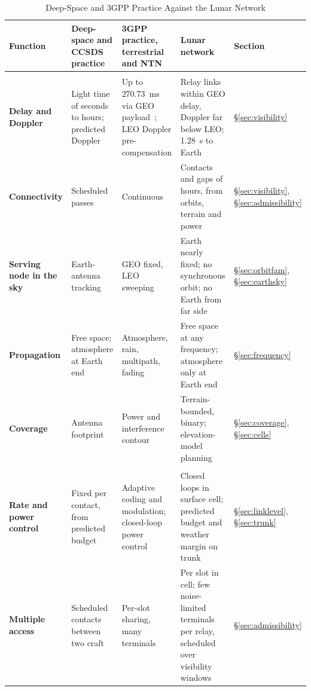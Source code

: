 \documentclass{IEEEoj}
\renewcommand{\arraystretch}{1.25}
\begin{document}
\begin{table}[!t]
\caption{Deep-Space and 3GPP Practice Against the Lunar Network}
\label{tab:rosetta_radio}
\centering
\footnotesize
\renewcommand{\arraystretch}{1.1}
\setlength{\tabcolsep}{4pt}
\begin{tabularx}{\textwidth}{@{}>{\raggedright\arraybackslash\bfseries}p{1.9cm}>{\raggedright\arraybackslash}p{2.9cm}>{\raggedright\arraybackslash}p{3.2cm}>{\raggedright\arraybackslash}X>{\raggedright\arraybackslash}p{1.15cm}@{}}
\toprule
\rowcolor{tabhead}\textbf{Function} & \textbf{Deep-space and CCSDS practice} & \textbf{3GPP practice, terrestrial and NTN} & \textbf{Lunar network} & \textbf{Section} \\
\midrule
\rowcolor{tabgroup}\multicolumn{5}{@{}l}{\emph{Geometry and propagation}}\\
Delay and Doppler & Light time of seconds to hours; predicted Doppler & Up to \SI{270.73}{ms} via GEO payload~\cite{3gpp_tr_38821}; LEO Doppler pre-compensation & Relay links within GEO delay, Doppler far below LEO; \SI{1.28}{\second} to Earth & \S\ref{sec:visibility} \\
Connectivity & Scheduled passes & Continuous & Contacts and gaps of hours, from orbits, terrain and power & \S\ref{sec:visibility}, \S\ref{sec:admissibility} \\
Serving node in the sky & Earth-antenna tracking & GEO fixed, LEO sweeping & Earth nearly fixed; no synchronous orbit; no Earth from far side & \S\ref{sec:orbitfam}, \S\ref{sec:earthsky} \\
Propagation & Free space; atmosphere at Earth end & Atmosphere, rain, multipath, fading & Free space at any frequency; atmosphere only at Earth end & \S\ref{sec:frequency} \\
Coverage & Antenna footprint & Power and interference contour & Terrain-bounded, binary; elevation-model planning & \S\ref{sec:coverage}, \S\ref{sec:cells} \\
\addlinespace[2pt]
\rowcolor{tabgroup}\multicolumn{5}{@{}l}{\emph{Radio layer}}\\
Rate and power control & Fixed per contact, from predicted budget & Adaptive coding and modulation; closed-loop power control~\cite{3gpp_tr_38821} & Closed loops in surface cell; predicted budget and weather margin on trunk & \S\ref{sec:linklevel}, \S\ref{sec:trunk} \\
Multiple access & Scheduled contacts between two craft~\cite{ccsds_prox1} & Per-slot sharing, many terminals & Per slot in cell; few noise-limited terminals per relay, scheduled over visibility windows & \S\ref{sec:admissibility} \\

\end{tabularx}
\end{table}
\end{document}
